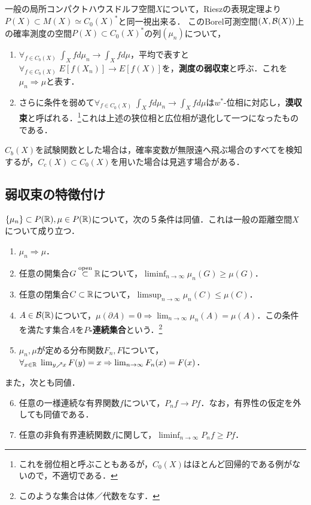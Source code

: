 \documentclass[uplatex,dvipdfmx]{jsreport}
\begin{document}
\begin{definition}
    一般の局所コンパクトハウスドルフ空間$X$について，Rieszの表現定理より$P(X)\subset M(X)\simeq C_0(X)^*$と同一視出来る．
    このBorel可測空間$(X,\mathcal{B}(X))$上の確率測度の空間$P(X)\subset C_0(X)^*$の列$(\mu_n)$について，
    \begin{enumerate}
        \item $\forall_{f\in C_b(X)}\;\int_Xfd\mu_n\to\int_Xfd\mu$，平均で表すと$\forall_{f\in C_b(X)}\;E[f(X_n)]\to E[f(X)]$を，\textbf{測度の弱収束}と呼ぶ．これを$\mu_n\Rightarrow\mu$と表す．
        \item さらに条件を弱めて$\forall_{f\in C_0(X)}\;\int_Xfd\mu_n\to\int_Xfd\mu$は$w^*$-位相に対応し，\textbf{漠収束}と呼ばれる．\footnote{これを弱位相と呼ぶこともあるが，$C_0(X)$はほとんど回帰的である例がないので，不適切である．}これは上述の狭位相と広位相が退化して一つになったものである．
    \end{enumerate}
\end{definition}
\begin{remarks}
    $C_b(X)$を試験関数とした場合は，確率変数が無限遠へ飛ぶ場合のすべてを検知するが，$C_c(X)\subset C_0(X)$を用いた場合は見逃す場合がある．
\end{remarks}

\subsection{弱収束の特徴付け}

\begin{theorem}\label{thm-Portmanteau}
    $\{\mu_n\}\subset P(\mathbb{R}),\mu\in P(\mathbb{R})$について，次の５条件は同値．これは一般の距離空間$X$について成り立つ．
    \begin{enumerate}
        \item $\mu_n\Rightarrow\mu$．
        \item 任意の開集合$G\overset{\mathrm{open}}{\subset}\mathbb{R}$について，$\liminf_{n\to\infty}\mu_n(G)\ge\mu(G)$．
        \item 任意の閉集合$C\subset\mathbb{R}$について，$\limsup_{n\to\infty}\mu_n(C)\le\mu(C)$．
        \item $A\in\mathcal{B}(\mathbb{R})$について，$\mu(\partial A)=0\Rightarrow\lim_{n\to\infty}\mu_n(A)=\mu(A)$．この条件を満たす集合$A$を\textbf{$P$-連続集合}という．\footnote{このような集合は体／代数をなす．}
        \item $\mu_n,\mu$が定める分布関数$F_n,F$について，$\forall_{x\in\mathbb{R}}\;\lim_{y\nearrow x}F(y)=x\Rightarrow\lim_{n\to\infty}F_n(x)=F(x)$．
    \end{enumerate}
    また，次とも同値．
    \begin{enumerate}\setcounter{enumi}{5}
        \item 任意の一様連続な有界関数$f$について，$P_nf\to Pf$．なお，有界性の仮定を外しても同値である．
        \item 任意の非負有界連続関数$f$に関して，$\liminf_{n\to\infty}P_nf\ge Pf$．
    \end{enumerate}
\end{theorem}
\end{document}
